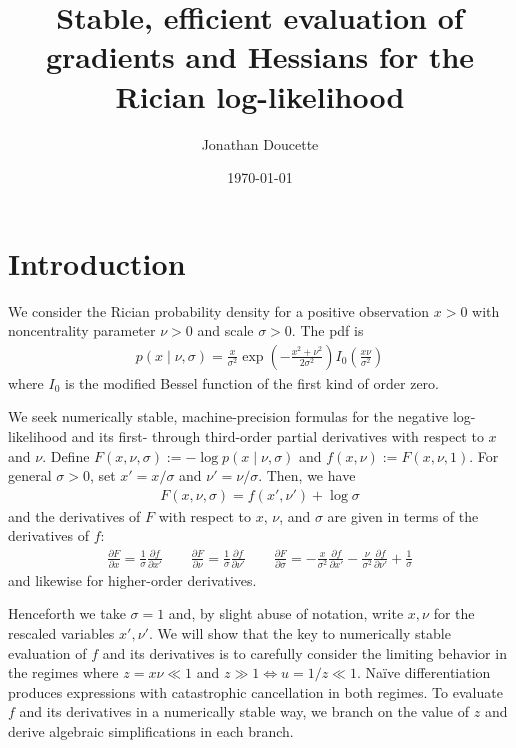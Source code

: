 \documentclass{article}
\title{Stable, efficient evaluation of gradients and Hessians for the Rician log-likelihood}
\author{Jonathan Doucette}
\date{\today}
\begin{document}
\maketitle

\section{Introduction}

We consider the Rician probability density for a positive observation $x>0$ with noncentrality parameter $\nu>0$ and scale $\sigma>0$.
The pdf is
%
\begin{align}
  p(x\mid\nu,\sigma) = \frac{x}{\sigma^2} \exp\left(-\frac{x^2+\nu^2}{2\sigma^2}\right) I_0\left(\frac{x\nu}{\sigma^2}\right)
\end{align}
%
where $I_0$ is the modified Bessel function of the first kind of order zero.

We seek numerically stable, machine-precision formulas for the negative log-likelihood and its first- through third-order partial derivatives with respect to $x$ and $\nu$.
Define $F(x,\nu,\sigma) := -\log p(x\mid\nu,\sigma)$ and $f(x,\nu) := F(x,\nu,1)$.
For general $\sigma>0$, set $x'=x/\sigma$ and $\nu'=\nu/\sigma$.
Then, we have
%
\begin{align}
  F(x,\nu,\sigma) = f(x',\nu') + \log\sigma
\end{align}
%
and the derivatives of $F$ with respect to $x$, $\nu$, and $\sigma$ are given in terms of the derivatives of $f$:
%
\begin{align}
  \frac{\partial F}{\partial x}      = \frac{1}{\sigma} \frac{\partial f}{\partial x'}                                                                                        \qquad
  \frac{\partial F}{\partial \nu}    = \frac{1}{\sigma} \frac{\partial f}{\partial \nu'}                                                                                      \qquad
  \frac{\partial F}{\partial \sigma} = -\frac{x}{\sigma^2} \frac{\partial f}{\partial x'} - \frac{\nu}{\sigma^2} \frac{\partial f}{\partial \nu'} + \frac{1}{\sigma}
\end{align}
%
and likewise for higher-order derivatives.

Henceforth we take $\sigma=1$ and, by slight abuse of notation, write $x,\nu$ for the rescaled variables $x',\nu'$.
We will show that the key to numerically stable evaluation of $f$ and its derivatives is to carefully consider the limiting behavior in the regimes where $z = x\nu \ll 1$ and $z \gg 1 \Leftrightarrow u=1/z \ll 1$.
Na\"ive differentiation produces expressions with catastrophic cancellation in both regimes.
To evaluate $f$ and its derivatives in a numerically stable way, we branch on the value of $z$ and derive algebraic simplifications in each branch.
\end{document}
